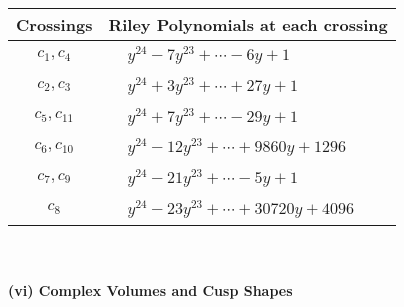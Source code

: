 \documentclass[1p]{elsarticle_modified}
\theoremstyle{definition}
\begin{document}
\begin{tabular}{m{50pt}|m{274pt}}
Crossings & \hspace{64pt}Riley Polynomials at each crossing \\
\hline $$\begin{aligned}c_{1},c_{4}\end{aligned}$$&$\begin{aligned}
&y^{24}-7 y^{23}+\cdots-6 y+1
\end{aligned}$\\
\hline $$\begin{aligned}c_{2},c_{3}\end{aligned}$$&$\begin{aligned}
&y^{24}+3 y^{23}+\cdots+27 y+1
\end{aligned}$\\
\hline $$\begin{aligned}c_{5},c_{11}\end{aligned}$$&$\begin{aligned}
&y^{24}+7 y^{23}+\cdots-29 y+1
\end{aligned}$\\
\hline $$\begin{aligned}c_{6},c_{10}\end{aligned}$$&$\begin{aligned}
&y^{24}-12 y^{23}+\cdots+9860 y+1296
\end{aligned}$\\
\hline $$\begin{aligned}c_{7},c_{9}\end{aligned}$$&$\begin{aligned}
&y^{24}-21 y^{23}+\cdots-5 y+1
\end{aligned}$\\
\hline $$\begin{aligned}c_{8}\end{aligned}$$&$\begin{aligned}
&y^{24}-23 y^{23}+\cdots+30720 y+4096
\end{aligned}$\\
\hline
\end{tabular}\\~\\
\newpage\flushleft \textbf{(vi) Complex Volumes and Cusp Shapes}
\end{document}
